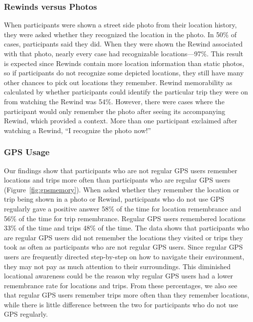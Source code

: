 \documentclass{sigchi}
\begin{document}
\subsubsection{Rewinds versus Photos}
When participants were shown a street side photo from their location history, they were asked whether they recognized the location in the photo. In 50\% of cases, participants said they did. When they were shown the Rewind associated with that photo, nearly every case had recognizable locations---97\%. This result is expected since Rewinds contain more location information than static photos, so if participants do not recognize some depicted locations, they still have many other chances to pick out locations they remember. Rewind memorability as calculated by whether participants could identify the particular trip they were on from watching the Rewind was 54\%. However, there were cases where the participant would only remember the photo after seeing its accompanying Rewind, which provided a context. More than one participant exclaimed after watching a Rewind, ``I recognize the photo now!''

\subsubsection{GPS Usage}
Our findings show that participants who are not regular GPS users remember locations and trips more often than participants who are regular GPS users (Figure~\ref{fig:gpsmemory}). When asked whether they remember the location or trip being shown in a photo or Rewind, participants who do not use GPS regularly gave a positive answer 58\% of the time for location remembrance and 56\% of the time for trip remembrance. Regular GPS users remembered locations 33\% of the time and trips 48\% of the time. The data shows that participants who are regular GPS users did not remember the locations they visited or trips they took as often as participants who are not regular GPS users. Since regular GPS users are frequently directed step-by-step on how to navigate their environment, they may not pay as much attention to their surroundings. This diminished locational awareness could be the reason why regular GPS users had a lower remembrance rate for locations and trips. From these percentages, we also see that regular GPS users remember trips more often than they remember locations, while there is little difference between the two for participants who do not use GPS regularly. 
\end{document}
